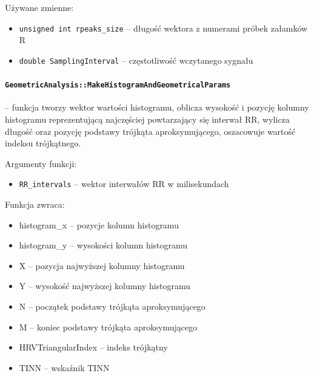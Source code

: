 \documentclass[a4paper, 11pt]{article}
\begin{document}
Używane zmienne:
\begin{itemize}
\item \verb+unsigned int rpeaks_size+ -- długość wektora z numerami próbek załamków
R
\item \verb+double SamplingInterval+ -- częstotliwość wczytanego sygnału
\end{itemize}

\medskip{}

\paragraph{\texttt{GeometricAnalysis::MakeHistogramAndGeometricalParams}} -- funkcja tworzy wektor wartości histogramu, oblicza wysokość i pozycję
kolumny histogramu reprezentującą najczęściej powtarzający się interwał
RR, wylicza długość oraz pozycję podstawy trójkąta aproksymującego,
oszacowuje wartość indeksu trójkątnego.

\medskip{}


Argumenty funkcji:
\begin{itemize}
\item \verb+RR_intervals+ -- wektor interwałów RR w milisekundach
\end{itemize}
\medskip{}


Funkcja zwraca:
\begin{itemize}
\item histogram\_x -- pozycje kolumn histogramu
\item histogram\_y -- wysokości kolumn histogramu
\item X -- pozycja najwyższej kolumny histogramu
\item Y -- wysokość najwyższej kolumny histogramu
\item N -- początek podstawy trójkąta aproksymującego
\item M -- koniec podstawy trójkąta aproksymującego
\item HRVTriangularIndex -- indeks trójkątny
\item TINN -- wskaźnik TINN
\end{itemize}
\medskip{}
\end{document}
